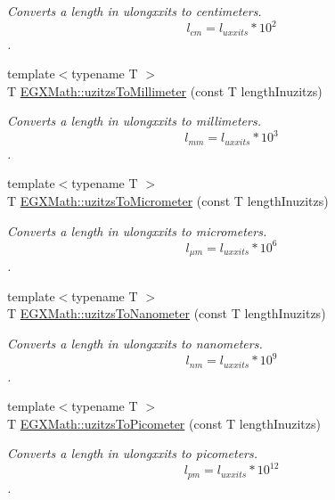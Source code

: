\begin{DoxyCompactItemize}
\begin{DoxyCompactList}\small\item\em Converts a length in ulongxxits to centimeters. \[ l_{cm}=l_{uxxits} * 10^{2} \]. \end{DoxyCompactList}\item 
{\footnotesize template$<$typename T $>$ }\\T \mbox{\hyperlink{group___e_g_x_math-_conversions-_length_conversions-_non-_s_i-uzitzs-_s_i_gaf507dd646327861da523586b417d132e}{E\+G\+X\+Math\+::uzitzs\+To\+Millimeter}} (const T length\+Inuzitzs)
\begin{DoxyCompactList}\small\item\em Converts a length in ulongxxits to millimeters. \[ l_{mm}=l_{uxxits} * 10^{3} \]. \end{DoxyCompactList}\item 
{\footnotesize template$<$typename T $>$ }\\T \mbox{\hyperlink{group___e_g_x_math-_conversions-_length_conversions-_non-_s_i-uzitzs-_s_i_ga0bd484a80b8b66cd5272bbbc1fe6b642}{E\+G\+X\+Math\+::uzitzs\+To\+Micrometer}} (const T length\+Inuzitzs)
\begin{DoxyCompactList}\small\item\em Converts a length in ulongxxits to micrometers. \[ l_{\mu m}=l_{uxxits} * 10^{6} \]. \end{DoxyCompactList}\item 
{\footnotesize template$<$typename T $>$ }\\T \mbox{\hyperlink{group___e_g_x_math-_conversions-_length_conversions-_non-_s_i-uzitzs-_s_i_ga6c21ffa2ef282d817d349c249eaaa21f}{E\+G\+X\+Math\+::uzitzs\+To\+Nanometer}} (const T length\+Inuzitzs)
\begin{DoxyCompactList}\small\item\em Converts a length in ulongxxits to nanometers. \[ l_{nm}=l_{uxxits} * 10^{9} \]. \end{DoxyCompactList}\item 
{\footnotesize template$<$typename T $>$ }\\T \mbox{\hyperlink{group___e_g_x_math-_conversions-_length_conversions-_non-_s_i-uzitzs-_s_i_ga48c60a4876ac426d1717096263648a4d}{E\+G\+X\+Math\+::uzitzs\+To\+Picometer}} (const T length\+Inuzitzs)
\begin{DoxyCompactList}\small\item\em Converts a length in ulongxxits to picometers. \[ l_{pm}=l_{uxxits} * 10^{12} \]. \end{DoxyCompactList}\item 

\end{DoxyCompactItemize}
